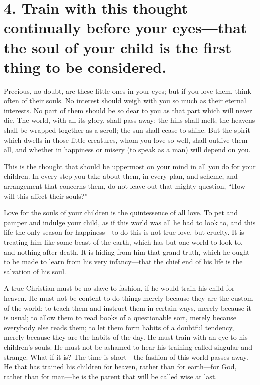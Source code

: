 \documentclass[
]{book}
\begin{document}
\hypertarget{train-with-this-thought-continually-before-your-eyesthat-the-soul-of-your-child-is-the-first-thing-to-be-considered.}{%
\section*{4. Train with this thought continually before your eyes---that the soul of your child is the first thing to be considered.}\label{train-with-this-thought-continually-before-your-eyesthat-the-soul-of-your-child-is-the-first-thing-to-be-considered.}}

Precious, no doubt, are these little ones in your eyes; but if you love them, think often of their souls. No interest should weigh with you so much as their eternal interests. No part of them should be so dear to you as that part which will never die. The world, with all its glory, shall pass away; the hills shall melt; the heavens shall be wrapped together as a scroll; the sun shall cease to shine. But the spirit which dwells in those little creatures, whom you love so well, shall outlive them all, and whether in happiness or misery (to speak as a man) will depend on you.

This is the thought that should be uppermost on your mind in all you do for your children. In every step you take about them, in every plan, and scheme, and arrangement that concerns them, do not leave out that mighty question, ``How will this affect their souls?''

Love for the souls of your children is the quintessence of all love. To pet and pamper and indulge your child, as if this world was all he had to look to, and this life the only season for happiness---to do this is not true love, but cruelty. It is treating him like some beast of the earth, which has but one world to look to, and nothing after death. It is hiding from him that grand truth, which he ought to be made to learn from his very infancy---that the chief end of his life is the salvation of his soul.

A true Christian must be no slave to fashion, if he would train his child for heaven. He must not be content to do things merely because they are the custom of the world; to teach them and instruct them in certain ways, merely because it is usual; to allow them to read books of a questionable sort, merely because everybody else reads them; to let them form habits of a doubtful tendency, merely because they are the habits of the day. He must train with an eye to his children's souls. He must not be ashamed to hear his training called singular and strange. What if it is? The time is short---the fashion of this world passes away. He that has trained his children for heaven, rather than for earth---for God, rather than for man---he is the parent that will be called wise at last.
\end{document}
